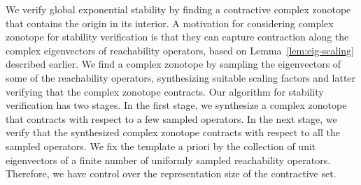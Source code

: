 We verify global exponential stability by finding a contractive
complex zonotope that contains the origin in its interior.  A
motivation for considering complex zonotope for stability verification
is that they can capture contraction along the complex eigenvectors of
reachability operators, based on Lemma~\ref{lem:eig-scaling} described
earlier.  We find a complex zonotope by sampling the eigenvectors of
some of the reachability operators, synthesizing suitable scaling
factors and latter verifying that the complex zonotope contracts.  Our
algorithm for stability verification has two stages.  In the first
stage, we synthesize a complex zonotope that contracts with respect to
a few sampled operators.  In the next stage, we verify that the
synthesized complex zonotope contracts with respect to all the sampled
operators.  We fix the template a priori by the collection of unit
eigenvectors of a finite number of uniformly sampled reachability
operators.  Therefore, we have control over the representation size of
the contractive set.

